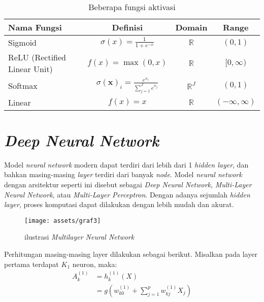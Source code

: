 \documentclass[a4paper,12pt]{report}
\begin{document}
\begin{longtable}{|l|c|c|c|}
	\caption{Beberapa fungsi aktivasi} \label{tabelfungsi}\\
	\hline
	\textbf{Nama Fungsi} & \textbf{Definisi} & \textbf{Domain} & \textbf{Range} \\ \hline
	Sigmoid & $\sigma(x) = \frac{1}{1 + e^{-x}}$ & $\mathbb{R}$ & $(0, 1)$ \\
	\hline
	
	ReLU (Rectified Linear Unit) & $f(x) = \max(0, x)$ & $\mathbb{R}$ & $[0, \infty)$ \\
	\hline
	
	Softmax & $\sigma(\mathbf{x})_i = \frac{e^{x_i}}{\sum_{j=1}^{J} e^{x_j}}$ & $\mathbb{R}^J$ & $(0, 1)$ \\
	\hline
	
	Linear & $f(x) = x$ & $\mathbb{R}$ & $(-\infty, \infty)$ \\
	\hline
\end{longtable}

\section{\textit{Deep Neural Network}}

Model \textit{neural network} modern dapat terdiri dari lebih dari 1 \textit{hidden layer}, dan bahkan masing-masing \textit{layer} terdiri dari banyak \textit{node}. Model \textit{neural network} dengan arsitektur seperti ini disebut sebagai \textit{Deep Neural Network}, \textit{Multi-Layer Neural Network}, atau \textit{Multi-Layer Perceptron}. Dengan adanya sejumlah \textit{hidden layer}, proses komputasi dapat dilakukan dengan lebih mudah dan akurat\cite{sohilIntroductionStatisticalLearning2022}. 

\begin{figure}[H]
	\center \texttt{[image: assets/graf3]}
	\caption{ilustrasi \textit{Multilayer Neural Network}} 
	\label{sumbar}
\end{figure}

Perhitungan masing-masing layer dilakukan sebagai berikut. Misalkan pada layer pertama terdapat $K_1$ neuron, maka:
\begin{equation}
	\begin{split}
		A_k^{(1)} &= h_k^{(1)}(X) \\
				  &= g\left(w_{k0}^{(1)} + \sum\limits_{j=1}^{p}w_{kj}^{(1)}X_{j}\right)
	\end{split}
	\label{multilayerA1}
\end{equation}
\end{document}
